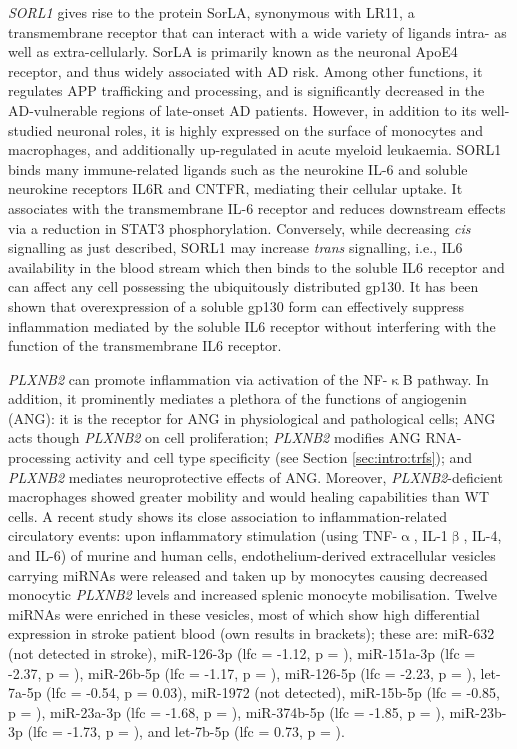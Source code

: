 \emph{SORL1} gives rise to the protein SorLA, synonymous with LR11, a transmembrane receptor that can interact with a wide variety of ligands intra- as well as extra-cellularly.\cite{Yin2015} SorLA is primarily known as the neuronal ApoE4 receptor, and thus widely associated with AD risk. Among other functions, it regulates APP trafficking and processing, and is significantly decreased in the AD-vulnerable regions of late-onset AD patients.\cite{Yin2015} However, in addition to its well-studied neuronal roles, it is highly expressed on the surface of monocytes and macrophages, and additionally up-regulated in acute myeloid leukaemia.\cite{Sakai2012} SORL1 binds many immune-related ligands such as the neurokine IL-6 and soluble neurokine receptors IL6R and CNTFR, mediating their cellular uptake. It associates with the transmembrane IL-6 receptor and reduces downstream effects via a reduction in STAT3 phosphorylation.\cite{Larsen2017} Conversely, while decreasing \emph{cis} signalling as just described, SORL1 may increase \emph{trans} signalling, i.e., IL6 availability in the blood stream which then binds to the soluble IL6 receptor and can affect any cell possessing the ubiquitously distributed gp130.\cite{Rabe2008} It has been shown that overexpression of a soluble gp130 form can effectively suppress inflammation mediated by the soluble IL6 receptor without interfering with the function of the transmembrane IL6 receptor.\cite{Rabe2008}

\emph{PLXNB2} can promote inflammation via activation of the NF-$\upkappa$B pathway.\cite{Zhang2018} In addition, it prominently mediates a plethora of the functions of angiogenin (ANG): it is the receptor for ANG in physiological and pathological cells; ANG acts though \emph{PLXNB2} on cell proliferation; \emph{PLXNB2} modifies ANG RNA-processing activity and cell type specificity (see Section \ref{sec:intro:trfs}); and \emph{PLXNB2} mediates neuroprotective effects of ANG.\cite{Yu2017} Moreover, \emph{PLXNB2}-deficient macrophages showed greater mobility and would healing capabilities than WT cells.\cite{Roney2011} A recent study shows its close association to inflammation-related circulatory events: upon inflammatory stimulation (using TNF-$\upalpha$, IL-1$\upbeta$, IL-4, and IL-6) of murine and human cells, endothelium-derived extracellular vesicles carrying miRNAs were released and taken up by monocytes causing decreased monocytic \emph{PLXNB2} levels and increased splenic monocyte mobilisation.\cite{Akbar2017} Twelve miRNAs were enriched in these vesicles, most of which show high differential expression in stroke patient blood (own results in brackets); these are: miR-632 (not detected in stroke), miR-126-3p (\ac{lfc} = -1.12, p = ), miR-151a-3p (\ac{lfc} = -2.37, p = ), miR-26b-5p (\ac{lfc} = -1.17, p = ), miR-126-5p (\ac{lfc} = -2.23, p = ), let-7a-5p (\ac{lfc} = -0.54, p = 0.03), miR-1972 (not detected), miR-15b-5p (\ac{lfc} = -0.85, p = ), miR-23a-3p (\ac{lfc} = -1.68, p = ), miR-374b-5p (\ac{lfc} = -1.85, p = ), miR-23b-3p (\ac{lfc} = -1.73, p = ), and let-7b-5p (\ac{lfc} = 0.73, p = ).

